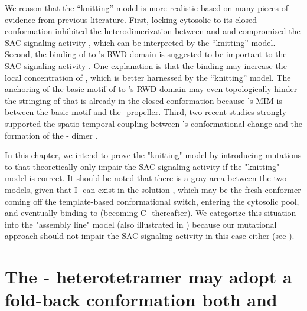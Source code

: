 We reason that the ``knitting'' model is more realistic based on many pieces of evidence from previous literature. First, locking cytosolic  to its closed conformation inhibited the heterodimerization between  and  and compromised the SAC signaling activity \cite{Ma+Poon2016, Ma+Poon2018, Kim2018}, which can be interpreted by the ``knitting'' model. Second, the binding of  to 's RWD domain is suggested to be important to the SAC signaling activity \cite{Kruse2014, SpMad1, Faesen2017, Ji2017eLife}. One explanation is that the binding may increase the local concentration of , which is better harnessed by the ``knitting'' model. The anchoring of the basic motif of  to 's RWD domain may even topologically hinder the stringing of  that is already in the closed conformation because 's MIM is between the basic motif and the \textbeta{}-propeller. Third, two recent studies strongly supported the spatio-temporal coupling between 's conformational change and the formation of the - dimer \cite{BUB1-CDC20-MAD1, Tripartite}.

In this chapter, we intend to prove the "knitting" model by introducing mutations to  that theoretically only impair the SAC signaling activity if the "knitting" model is correct. It should be noted that there is a gray area between the two models, given that I- can exist in the solution \cite{I-MAD2}, which may be the fresh  conformer coming off the template-based conformational switch, entering the cytosolic pool, and eventually binding to  (becoming C- thereafter). We categorize this situation into the "assembly line" model (also illustrated in ) because our mutational approach should not impair the SAC signaling activity in this case either (see ).

\section{The - heterotetramer may adopt a fold-back conformation both  and }
\label{TwoPossibilities}

